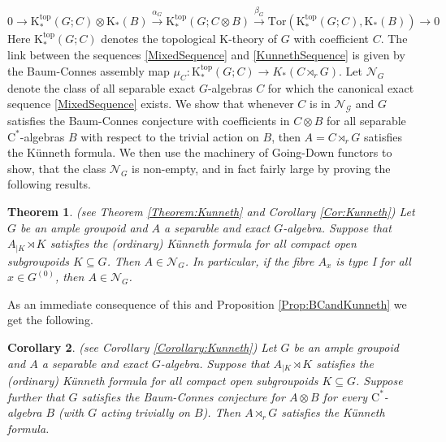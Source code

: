 \documentclass[reqno,oneside,a4paper,11pt]{amsart}
\theoremstyle{theorem}
\newtheorem{thmx}{Theorem}
\newtheorem{corx}[thmx]{Corollary}
\theoremstyle{definition}
\newcommand{\K}{\mathrm K}
\begin{document}
		\begin{equation}\label{MixedSequence}
		0\rightarrow \K_*^{\mathrm{top}}(G;C)\otimes\K_*(B)\stackrel{\alpha_G}{\rightarrow}\K_*^{\mathrm{top}}(G;C\otimes B)\stackrel{\beta_G}{\rightarrow}\mathrm{Tor}(\K_*^{\mathrm{top}}(G;C),\K_*(B))\rightarrow 0
		\end{equation}
	Here $\K_*^{\mathrm{top}}(G;C)$ denotes the topological $\K$-theory of $G$ with coefficient $C$. The link between the sequences \ref{MixedSequence} and \ref{KunnethSequence} is given by the Baum-Connes assembly map $\mu_C:\K_*^{\mathrm{top}}(G;C)\rightarrow K_*(C\rtimes_r G)$.
	Let $\mathcal{N}_G$ denote the class of all separable exact $G$-algebras $C$ for which the canonical exact sequence \ref{MixedSequence} exists. We show that whenever $C$ is in $\mathcal{N_G}$ and $G$ satisfies the Baum-Connes conjecture with coefficients in $C\otimes B$ for all separable $\mathrm{C}^*$-algebras $B$ with respect to the trivial action on $B$, then $A=C\rtimes_r G$ satisfies the Künneth formula.
	We then use the machinery of Going-Down functors to show, that the class $\mathcal{N}_G$ is non-empty, and in fact fairly large by proving the following results.
	\begin{thmx}(see Theorem \ref{Theorem:Kunneth} and Corollary \ref{Cor:Kunneth})
		Let $G$ be an ample groupoid and $A$ a separable and exact $G$-algebra. Suppose that $A_{\mid K}\rtimes K$ satisfies the (ordinary) Künneth formula for all compact open subgroupoids $K\subseteq G$. Then $A\in \mathcal{N}_G$. In particular, if the fibre $A_x$ is type I for all $x\in G^{(0)}$, then $A\in \mathcal{N}_G$.
	\end{thmx}
	
	As an immediate consequence of this and Proposition \ref{Prop:BCandKunneth} we get the following.
	\begin{corx}(see Corollary \ref{Corollary:Kunneth})
		Let $G$ be an ample groupoid and $A$ a separable and exact $G$-algebra. Suppose that $A_{\mid K}\rtimes K$ satisfies the (ordinary) Künneth formula for all compact open subgroupoids $K\subseteq G$. Suppose further that $G$ satisfies the Baum-Connes conjecture for $A\otimes B$ for every $\mathrm{C}^*$-algebra $B$ (with $G$ acting trivially on $B$).
		Then $A\rtimes_r G$ satisfies the Künneth formula. 
	\end{corx}
	
\end{document}
